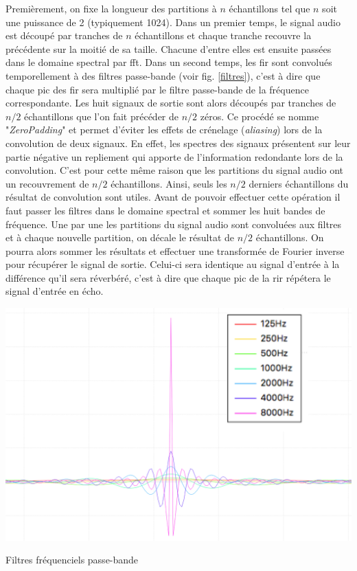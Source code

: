 Premièrement, on fixe la longueur des partitions à $n$ échantillons tel que $n$ soit une puissance de 2 (typiquement 1024). Dans un premier temps, le signal audio est découpé par tranches de $n$ échantillons et chaque tranche recouvre la précédente sur la moitié de sa taille. Chacune d'entre elles est ensuite passées dans le domaine spectral par \gls{fft}. Dans un second temps, les \gls{fir} sont convolués temporellement à des filtres passe-bande (voir fig. \ref{filtres}), c'est à dire que chaque pic des \gls{fir} sera multiplié par le filtre passe-bande de la fréquence correspondante. Les huit signaux de sortie sont alors découpés par tranches de $n/2$ échantillons que l'on fait précéder de $n/2$ zéros. Ce procédé se nomme "\textit{ZeroPadding}" et permet d'éviter les effets de crénelage (\textit{aliasing}) lors de la convolution de deux signaux. En effet, les spectres des signaux présentent sur leur partie négative un repliement qui apporte de l'information redondante lors de la convolution. C'est pour cette même raison que les partitions du signal audio ont un recouvrement de $n/2$ échantillons. Ainsi, seuls les $n/2$ derniers échantillons du résultat de convolution sont utiles. Avant de pouvoir effectuer cette opération il faut passer les filtres dans le domaine spectral et sommer les huit bandes de fréquence. Une par une les partitions du signal audio sont convoluées aux filtres et à chaque nouvelle partition, on décale le résultat de $n/2$ échantillons. On pourra alors sommer les résultats et effectuer une transformée de Fourier inverse pour récupérer le signal de sortie. Celui-ci sera identique au signal d'entrée à la différence qu'il sera réverbéré, c'est à dire que chaque pic de la \gls{rir} répétera le signal d'entrée en écho.

\begin{figureth}
	\includegraphics[width=0.9\linewidth]{images/filtres}
	\caption{Filtres fréquenciels passe-bande}
	\label{filtres}
\end{figureth}

